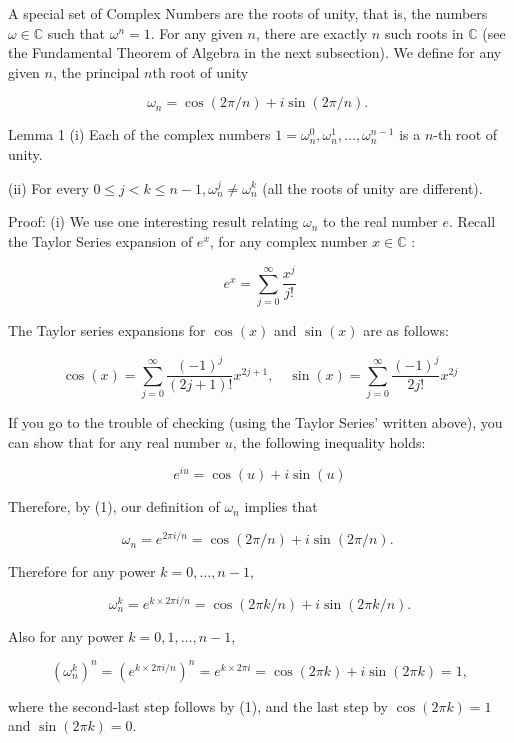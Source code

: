 A special set of Complex Numbers are the roots of unity, that is, the numbers $\omega \in \mathbb{C}$ such that $\omega^{n}=1$. For any given $n$, there are exactly $n$ such roots in $\mathbb{C}$ (see the Fundamental Theorem of Algebra in the next subsection). We define for any given $n$, the principal $n$th root of unity

$$
\omega_{n}=\cos (2 \pi / n)+i \sin (2 \pi / n) \text {. }
$$

Lemma 1 (i) Each of the complex numbers $1=\omega_{n}^{0}, \omega_{n}^{1}, \ldots, \omega_{n}^{n-1}$ is a $n$-th root of unity.

(ii) For every $0 \leq j<k \leq n-1, \omega_{n}^{j} \neq \omega_{n}^{k}$ (all the roots of unity are different).

Proof: (i) We use one interesting result relating $\omega_{n}$ to the real number $e$. Recall the Taylor Series expansion of $e^{x}$, for any complex number $x \in \mathbb{C}$ :

$$
e^{x}=\sum_{j=0}^{\infty} \frac{x^{j}}{j !}
$$

The Taylor series expansions for $\cos (x)$ and $\sin (x)$ are as follows:

$$
\cos (x)=\sum_{j=0}^{\infty} \frac{(-1)^{j}}{(2 j+1) !} x^{2 j+1}, \quad \sin (x)=\sum_{j=0}^{\infty} \frac{(-1)^{j}}{2 j !} x^{2 j}
$$

If you go to the trouble of checking (using the Taylor Series' written above), you can show that for any real number $u$, the following inequality holds:


\begin{equation*}
e^{i u}=\cos (u)+i \sin (u) \tag{1}
\end{equation*}


Therefore, by (1), our definition of $\omega_{n}$ implies that

$$
\omega_{n}=e^{2 \pi i / n}=\cos (2 \pi / n)+i \sin (2 \pi / n) \text {. }
$$

Therefore for any power $k=0, \ldots, n-1$,

$$
\omega_{n}^{k}=e^{k \times 2 \pi i / n}=\cos (2 \pi k / n)+i \sin (2 \pi k / n) .
$$

Also for any power $k=0,1, \ldots, n-1$,

$$
\left(\omega_{n}^{k}\right)^{n}=\left(e^{k \times 2 \pi i / n}\right)^{n}=e^{k \times 2 \pi i}=\cos (2 \pi k)+i \sin (2 \pi k)=1,
$$

where the second-last step follows by (1), and the last step by $\cos (2 \pi k)=1$ and $\sin (2 \pi k)=0$.

